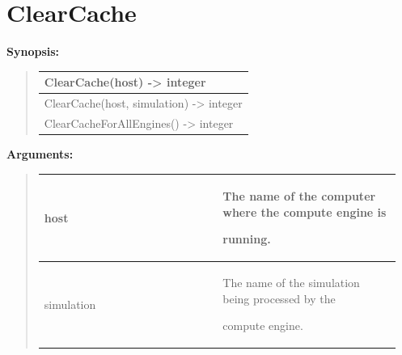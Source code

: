 \documentclass[letterpaper,10pt,english]{sphinxmanual}
\begin{document}
\section{ClearCache}
\label{functions:clearcache}
\begin{DUlineblock}{0em}
\item[] \textbf{Synopsis:}
\end{DUlineblock}
\begin{quote}

\begin{tabulary}{\linewidth}{|L|}
\hline

ClearCache(host) -\textgreater{} integer
\\
\hline
ClearCache(host, simulation) -\textgreater{} integer
\\
\hline
ClearCacheForAllEngines() -\textgreater{} integer
\\
\hline\end{tabulary}

\end{quote}

\begin{DUlineblock}{0em}
\item[] 
\item[] \textbf{Arguments:}
\end{DUlineblock}
\begin{quote}

\begin{tabular}{|p{0.475\linewidth}|p{0.475\linewidth}|}
\hline

host
 & 
\begin{DUlineblock}{0em}
\item[] The name of the computer where the compute engine is
\item[] running.
\end{DUlineblock}
\\
\hline
simulation
 & 
\begin{DUlineblock}{0em}
\item[] The name of the simulation being processed by the
\item[] compute engine.
\end{DUlineblock}
\\
\hline\end{tabular}

\end{quote}
\end{document}
